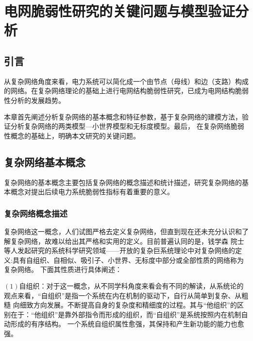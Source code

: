 \chapter{电网脆弱性研究的关键问题与模型验证分析}
\label{cha:model}

\section{引言}
\label{sec:index2}
从复杂网络角度来看，电力系统可以简化成一个由节点（母线）和边（支路）构成的网络。在复杂网络理论的基础上进行电网结构脆弱性研究，已成为电网结构脆弱性分析的发展趋势。

本章首先阐述分析复杂网络的基本概念和特征参数，基于复杂网络的建模方法，验证分析复杂网络的两类模型—小世界模型和无标度模型。最后，
在复杂网络脆弱性概念的基础上，明确本文研究的关键问题。

\section{复杂网络基本概念}
\label{sec:powersys}
复杂网络的基本概念主要包括复杂网络的概念描述和统计描述，研究复杂网络的基本概念对提出后续电力系统脆弱性指标有着重要的意义。

\subsection{复杂网络概念描述}
\label{sec:composite}
复杂网络这一概念，人们试图严格去定义复杂网络，但直到现在还未充分认识和了解复杂网络，故难以给出其严格和实用的定义\cite{refs31}。目前普遍认同的是，钱学森
院士等人发起研究的系统科学研究领域——开放的复杂巨系统理论中对复杂网络的定义:具有自组织、自相似、吸引子、小世界、无标度中部分或全部性质的网络称为复杂网络\cite{refs83}。
下面其性质进行具体阐述：

$(1)$自组织：对于这一概念，从不同学科角度来看会有不同的解读，从系统论的观点来看，“自组织”是指一个系统在内在机制的驱动下，自行从简单到复杂、从粗糙
向细致方向发展。不断提高自身的复杂度和精细度的过程。其与“他组织”的区别在于：“他组织”是靠外部指令而形成的组织，而“自组织”是系统按照内在机制自动形成的有序结构。
一个系统自组织属性愈强，其保持和产生新功能的能力也愈强。

